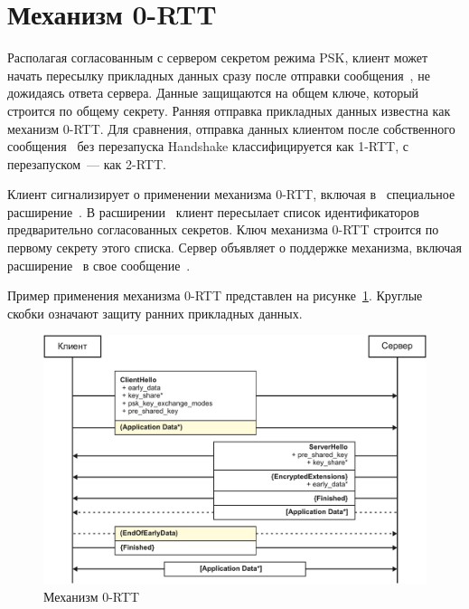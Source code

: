 \section{Механизм 0-RTT}\label{COMMON.ZeroRTT} 

Располагая согласованным с сервером секретом режима PSK, клиент может начать 
пересылку прикладных данных сразу после отправки 
сообщения~, не дожидаясь ответа сервера. Данные 
защищаются на общем ключе, который строится по общему секрету. Ранняя отправка 
прикладных данных известна как механизм 0-RTT. Для сравнения, отправка данных 
клиентом после собственного сообщения~ без 
перезапуска Handshake классифицируется как 1-RTT, с перезапуском~---
как 2-RTT.

Клиент сигнализирует о применении механизма 0-RTT, включая
в~ специальное 
расширение~. В 
расширении~ клиент пересылает список 
идентификаторов предварительно согласованных секретов. Ключ механизма 0-RTT
строится по первому секрету этого списка. Сервер объявляет о поддержке
механизма, включая расширение~ в свое
сообщение~.

Пример применения механизма 0-RTT представлен на 
рисунке~\ref{Fig.COMMON.ZeroRTT}. Круглые скобки означают защиту ранних
прикладных данных.

\begin{figure}[hbt]
\begin{center}
\includegraphics[width=15cm]{../figs/ZeroRTT}
\end{center}
\caption{Механизм 0-RTT}\label{Fig.COMMON.ZeroRTT}
\end{figure}

